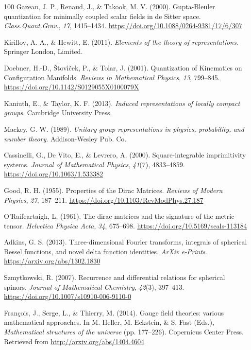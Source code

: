 \documentclass[11pt]{book}
\begin{document}
\begin{thebibliography}{100}
 Gazeau, J. P., Renaud, J., \& Takook, M. V. (2000). Gupta-Bleuler
quantization for minimally coupled scalar fields in de Sitter space.
\emph{Class.Quant.Grav.}, \emph{17}, 1415--1434.
\url{https://doi.org/10.1088/0264-9381/17/6/307}

 Kirillov, A. A., \& Hewitt, E. (2011). \emph{Elements of the theory of
representations}. Springer London, Limited.

 Doebner, H.-D., Šťovı́ček, P., \& Tolar, J. (2001). Quantization of
Kinematics on Configuration Manifolds. \emph{Reviews in Mathematical
Physics}, \emph{13}, 799--845.
\url{https://doi.org/10.1142/S0129055X0100079X}

 Kaniuth, E., \& Taylor, K. F. (2013). \emph{Induced representations of
locally compact groups}. Cambridge University Press.

 Mackey, G. W. (1989). \emph{Unitary group representations in physics,
probability, and number theory}. Addison-Wesley Pub. Co.

 Cassinelli, G., De Vito, E., \& Levrero, A. (2000). Square-integrable
imprimitivity systems. \emph{Journal of Mathematical Physics},
\emph{41}(7), 4833--4859. \url{https://doi.org/10.1063/1.533382}

 Good, R. H. (1955). Properties of the Dirac Matrices. \emph{Reviews of
Modern Physics}, \emph{27}, 187--211.
\url{https://doi.org/10.1103/RevModPhys.27.187}

 O'Raifeartaigh, L. (1961). The dirac matrices and the signature of the
metric tensor. \emph{Helvetica Physica Acta}, \emph{34}, 675--698.
\url{https://doi.org/10.5169/seals-113184}

 Adkins, G. S. (2013). Three-dimensional Fourier transforms, integrals of
spherical Bessel functions, and novel delta function identities.
\emph{ArXiv e-Prints}. \url{https://arxiv.org/abs/1302.1830}

 Szmytkowski, R. (2007). Recurrence and differential relations for
spherical spinors. \emph{Journal of Mathematical Chemistry},
\emph{42}(3), 397--413. \url{https://doi.org/10.1007/s10910-006-9110-0}

 François, J., Serge, L., \& Thierry, M. (2014). Gauge field theories:
various mathematical approaches. In M. Heller, M. Eckstein, \& S. Fast
(Eds.), \emph{Mathematical structures of the universe} (pp. 177--226).
Copernicus Center Press. Retrieved from
\url{http://arxiv.org/abs/1404.4604}


\end{thebibliography}
\end{document}
